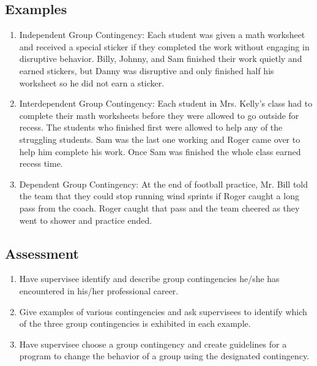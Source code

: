 \subsection{Examples}
\begin{enumerate}
\item Independent Group Contingency: Each student was given a math worksheet and received a special sticker if they completed the work without engaging in disruptive behavior. Billy, Johnny, and Sam finished their work quietly and earned stickers, but Danny was disruptive and only finished half his worksheet so he did not earn a sticker.
\item Interdependent Group Contingency: Each student in Mrs. Kelly's class had to complete their math worksheets before they were allowed to go outside for recess. The students who finished first were allowed to help any of the struggling students. Sam was the last one working and Roger came over to help him complete his work. Once Sam was finished the whole class earned recess time.
\item Dependent Group Contingency: At the end of football practice, Mr. Bill told the team that they could stop running wind sprints if Roger caught a long pass from the coach. Roger caught that pass and the team cheered as they went to shower and practice ended.
\end{enumerate}
%
\subsection{Assessment}
\begin{enumerate}
\item Have supervisee identify and describe group contingencies he/she has encountered in his/her professional career.
\item Give examples of various contingencies and ask supervisees to identify which of the three group contingencies is exhibited in each example.
\item Have supervisee choose a group contingency and create guidelines for a program to change the behavior of a group using the designated contingency.
\end{enumerate}
%
